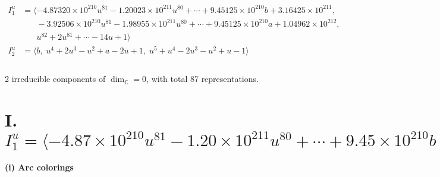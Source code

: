 \documentclass[1p]{elsarticle_modified}
\theoremstyle{definition}
\begin{document}
\begin{align*}
I^u_{1}&=\langle 
-4.87320\times10^{210} u^{81}-1.20023\times10^{211} u^{80}+\cdots+9.45125\times10^{210} b+3.16425\times10^{211},\\
\phantom{I^u_{1}}&\phantom{= \langle  }-3.92506\times10^{210} u^{81}-1.98955\times10^{211} u^{80}+\cdots+9.45125\times10^{210} a+1.04962\times10^{212},\\
\phantom{I^u_{1}}&\phantom{= \langle  }u^{82}+2 u^{81}+\cdots-14 u+1\rangle \\
I^u_{2}&=\langle 
b,\;u^4+2 u^3- u^2+a-2 u+1,\;u^5+u^4-2 u^3- u^2+u-1\rangle \\
\\
\end{align*}
\raggedright * 2 irreducible components of $\dim_{\mathbb{C}}=0$, with total 87 representations.\\
\newpage
\renewcommand{\arraystretch}{1}
\centering \section*{I. $I^u_{1}= \langle -4.87\times10^{210} u^{81}-1.20\times10^{211} u^{80}+\cdots+9.45\times10^{210} b+3.16\times10^{211},\;-3.93\times10^{210} u^{81}-1.99\times10^{211} u^{80}+\cdots+9.45\times10^{210} a+1.05\times10^{212},\;u^{82}+2 u^{81}+\cdots-14 u+1 \rangle$}
\flushleft \textbf{(i) Arc colorings}\\
\end{document}
